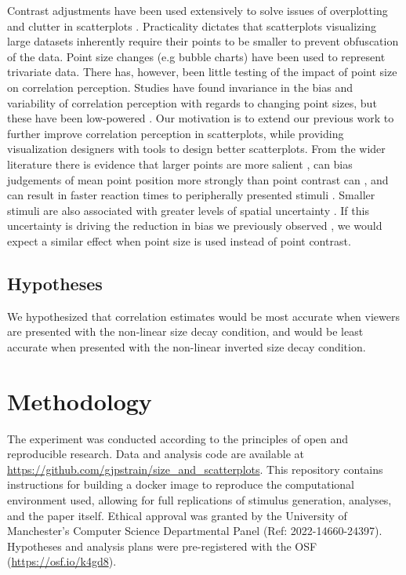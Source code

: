 \documentclass{vgtc}                          %
\begin{document}
Contrast adjustments have been used extensively to solve issues of overplotting and clutter
in scatterplots \cite{matejka_2015, bertini_2004}. Practicality dictates that
scatterplots visualizing large datasets inherently require their points to be
smaller to prevent obfuscation of the data. Point size changes (e.g bubble charts)
have been used to represent trivariate data. There has, however, been little testing of the
impact of point size on correlation perception. Studies have found
invariance in the bias and variability of correlation
perception with regards to changing point sizes, but these have been low-powered
\cite{rensink_2012, rensink_2014}. Our motivation is to extend our previous work
\cite{strain_2023} to further improve correlation perception in scatterplots, while
providing visualization designers with tools to design better scatterplots.
From the wider literature there is evidence that larger points are more salient
\cite{healey_2012}, can bias judgements of
mean point position more strongly than point contrast can \cite{hong_2021}, and can
result in faster reaction times to peripherally presented stimuli \cite{grice_1983}.
Smaller stimuli are also associated with greater levels of spatial uncertainty
\cite{alais_2004}. If this uncertainty is driving the reduction in bias we previously
observed \cite{strain_2023}, we would expect a similar effect when
point size is used instead of point contrast.

\hypertarget{hypotheses}{%
\subsection{Hypotheses}\label{hypotheses}}

We hypothesized that correlation estimates would be most accurate when
viewers are presented with the non-linear size decay condition, and would be
least accurate when presented with the non-linear inverted size decay condition.

\hypertarget{methodology}{%
\section{Methodology}\label{methodology}}

The experiment was conducted according to the principles of open and reproducible research.
Data and analysis code are available at \url{https://github.com/gjpstrain/size_and_scatterplots}.
This repository contains instructions for building a docker image to
reproduce the computational environment used, allowing for full replications
of stimulus generation, analyses, and the paper itself. Ethical approval was granted by the University
of Manchester's Computer Science Departmental Panel (Ref: 2022-14660-24397).
Hypotheses and analysis plans were pre-registered with the OSF (\url{https://osf.io/k4gd8}).
\end{document}
